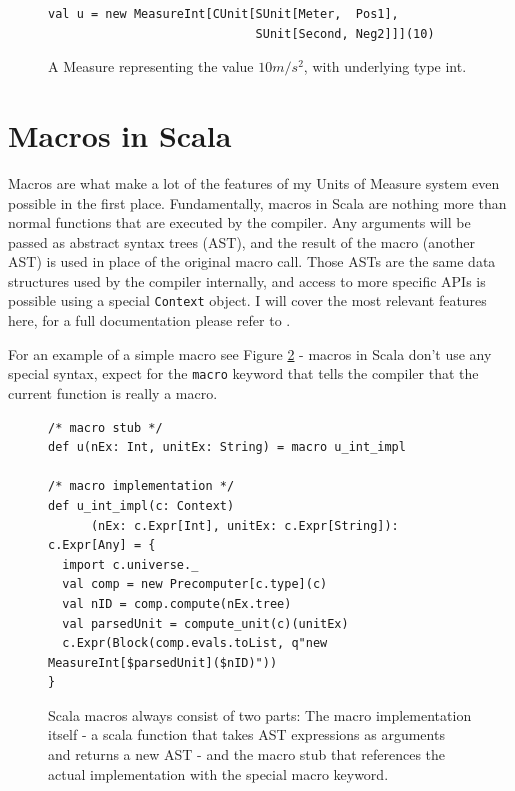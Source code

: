 \documentclass[12pt,oneside,a4paper]{scrbook}
\begin{document}
\begin{figure}
\begin{verbatim}
val u = new MeasureInt[CUnit[SUnit[Meter,  Pos1],
                             SUnit[Second, Neg2]]](10)
\end{verbatim}
\caption{A Measure representing the value $10 m/s^2$, with underlying type int.}
\label{code:scala_measure}
\end{figure}


\section{Macros in Scala}
\label{sec:macros}

Macros are what make a lot of the features of my Units of Measure system even possible in the first place. Fundamentally, macros in Scala are nothing more than normal functions that are executed by the compiler. Any arguments will be passed as abstract syntax trees (AST), and the result of the macro (another AST) is used in place of the original macro call. Those ASTs are the same data structures used by the compiler internally, and access to more specific APIs is possible using a special \verb|Context| object. I will cover the most relevant features here, for a full documentation please refer to \citep{Eugene13}.

For an example of a simple macro see Figure \ref{code:scala_macro} - macros in Scala don't use any special syntax, expect for the \verb|macro| keyword that tells the compiler that the current function is really a macro.



\begin{figure}
\begin{verbatim}
/* macro stub */
def u(nEx: Int, unitEx: String) = macro u_int_impl

/* macro implementation */
def u_int_impl(c: Context)
      (nEx: c.Expr[Int], unitEx: c.Expr[String]): c.Expr[Any] = {
  import c.universe._
  val comp = new Precomputer[c.type](c)
  val nID = comp.compute(nEx.tree)
  val parsedUnit = compute_unit(c)(unitEx)
  c.Expr(Block(comp.evals.toList, q"new MeasureInt[$parsedUnit]($nID)"))
}
\end{verbatim}
\caption{Scala macros always consist of two parts: The macro implementation itself - a scala function that takes AST expressions as arguments and returns a new AST - and the macro stub that references the actual implementation with the special macro keyword.}
\label{code:scala_macro}
\end{figure}
\end{document}
